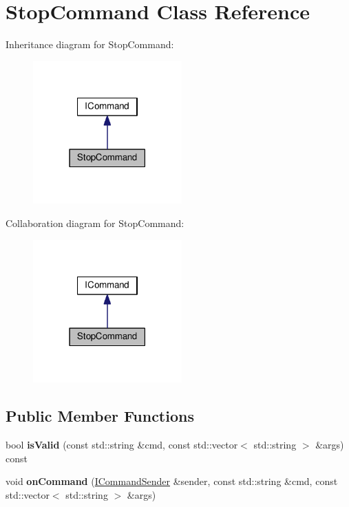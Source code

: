 \hypertarget{class_stop_command}{\section{Stop\-Command Class Reference}
\label{class_stop_command}
}


Inheritance diagram for Stop\-Command\-:
\nopagebreak
\begin{figure}[H]
\begin{center}
\leavevmode
\includegraphics[width=162pt]{class_stop_command__inherit__graph}
\end{center}
\end{figure}


Collaboration diagram for Stop\-Command\-:
\nopagebreak
\begin{figure}[H]
\begin{center}
\leavevmode
\includegraphics[width=162pt]{class_stop_command__coll__graph}
\end{center}
\end{figure}
\subsection*{Public Member Functions}
\begin{DoxyCompactItemize}
\item 
\hypertarget{class_stop_command_a0f9a9fd9bb238524e1be3ea25b9bbb79}{bool {\bfseries is\-Valid} (const std\-::string \&cmd, const std\-::vector$<$ std\-::string $>$ \&args) const }\label{class_stop_command_a0f9a9fd9bb238524e1be3ea25b9bbb79}

\item 
\hypertarget{class_stop_command_a5f1df22a117e1f9afd65f0c55dcfc983}{void {\bfseries on\-Command} (\hyperlink{class_i_command_sender}{I\-Command\-Sender} \&sender, const std\-::string \&cmd, const std\-::vector$<$ std\-::string $>$ \&args)}\label{class_stop_command_a5f1df22a117e1f9afd65f0c55dcfc983}

\end{DoxyCompactItemize}


